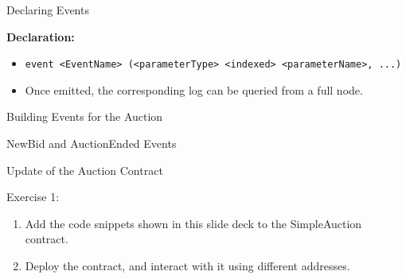 \documentclass[handout]{beamer}
\begin{document}
\begin{frame}{Declaring Events}

\textbf{Declaration:}
\begin{itemize}
	\item \texttt{event <EventName> (<parameterType> <indexed> <parameterName>, ...)}
	\item	Once emitted, the corresponding log can be queried from a full node.  
\end{itemize}




\end{frame}

\begin{frame}{Building Events for the Auction}

\begin{samplecode}{NewBid and AuctionEnded Events}
	
\end{samplecode}

\end{frame}

\begin{frame}{Update of the Auction Contract}
	\begin{exercise}{Exercise 1:}
	\begin{enumerate}
		\item Add the code snippets shown in this slide deck to the SimpleAuction contract.
		\item Deploy the contract, and interact with it using different addresses.
	\end{enumerate}
	\end{exercise}
\end{frame}
\end{document}
